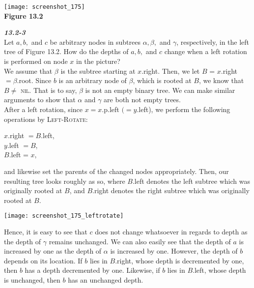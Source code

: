 \documentclass{article}
\begin{document}
\begin{center}
\texttt{[image: screenshot\_175]}\\
\textbf{Figure 13.2}
\end{center}

\textbf{\textit{13.2-3}}\\
Let $a, b,$ and $c$ be arbitrary nodes in subtrees $\alpha, \beta,$ and $\gamma$, respectively, in the left tree of Figure 13.2. How do the depths of $a, b,$ and $c$ change when a left rotation is performed on node $x$ in the picture?\\

We assume that $\beta$ is the subtree starting at $x$.right. Then, we let $B$ = $x$.right $= \beta$.root. Since $b$ is an arbitrary node of $\beta$, which is rooted at $B$, we know that $B \neq$ \textsc{nil}. That is to say, $\beta$ is not an empty binary tree. We can make similar arguments to show that $\alpha$ and $\gamma$ are both not empty trees.\\

After a left rotation, since $x = x.$p.left $(= y.$left), we perform the following operations by \textsc{Left-Rotate}:
\begin{center}
$x$.right $= B.$left,\\
$y$.left $= B$,\\
$B$.left = $x$,
\end{center}
and likewise set the parents of the changed nodes appropriately. Then, our resulting tree looks roughly as so, where $B.$left denotes the left subtree which was originally rooted at $B$, and $B.$right denotes the right subtree which was originally rooted at $B$.
\begin{center}
\texttt{[image: screenshot\_175\_leftrotate]}
\end{center}
Hence, it is easy to see that $c$ does not change whatsoever in regards to depth as the depth of $\gamma$ remains unchanged. We can also easily see that the depth of $a$ is increased by one as the depth of $\alpha$ is increased by one. However, the depth of $b$ depends on its location. If $b$ lies in $B.$right, whose depth is decremented by one, then $b$ has a depth decremented by one. Likewise, if $b$ lies in $B.$left, whose depth is unchanged, then $b$ has an unchanged depth.
\end{document}
